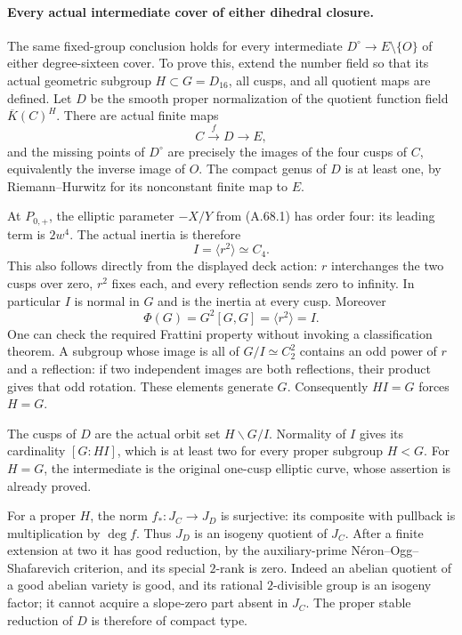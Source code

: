 \paragraph{Every actual intermediate cover of either dihedral closure.}
The same fixed-group conclusion holds for every intermediate
\(D^\circ\to E\setminus\{O\}\) of either degree-sixteen cover.
To prove this, extend the number field so that its actual geometric
subgroup \(H\subset G=D_{16}\), all cusps, and all quotient maps are
defined. Let \(D\) be the smooth proper normalization of the quotient
function field \(\overline K(C)^H\). There are actual finite maps
\[
                   C\xrightarrow{f}D\longrightarrow E,
\]
and the missing points of \(D^\circ\) are precisely the images of
the four cusps of \(C\), equivalently the inverse image of \(O\).
The compact genus of \(D\) is at least one, by Riemann--Hurwitz
for its nonconstant finite map to \(E\).

At \(P_{0,+}\), the elliptic parameter \(-X/Y\) from (A.68.1)
has order four: its leading term is \(2w^4\). The actual inertia
is therefore
\[
 I=\langle r^2\rangle\simeq C_4.
\]
This also follows directly from the displayed deck action:
\(r\) interchanges the two cusps over zero, \(r^2\) fixes
each, and every reflection sends zero to infinity. In particular
\(I\) is normal in \(G\) and is the inertia at every cusp.
Moreover
\[
 \Phi(G)=G^2[G,G]=\langle r^2\rangle=I.
\]
One can check the required Frattini property without invoking
a classification theorem. A subgroup whose image is all of
\(G/I\simeq C_2^2\) contains an odd power of \(r\) and a
reflection: if two independent images are both reflections,
their product gives that odd rotation. These elements generate
\(G\). Consequently \(HI=G\) forces \(H=G\).

The cusps of \(D\) are the actual orbit set
\(H\backslash G/I\). Normality of \(I\) gives its cardinality
\([G:HI]\), which is at least two for every proper subgroup
\(H<G\). For \(H=G\), the intermediate is the original
one-cusp elliptic curve, whose assertion is already proved.

For a proper \(H\), the norm
\(f_*:J_C\to J_D\) is surjective: its composite with pullback
is multiplication by \(\deg f\). Thus \(J_D\) is an isogeny
quotient of \(J_C\). After a finite extension at two it has
good reduction, by the auxiliary-prime
N\'eron--Ogg--Shafarevich criterion, and its special \(2\)-rank
is zero. Indeed an abelian quotient of a good abelian variety
is good, and its rational \(2\)-divisible group is an isogeny
factor; it cannot acquire a slope-zero part absent in \(J_C\).
The proper stable reduction of \(D\) is therefore of compact type.

